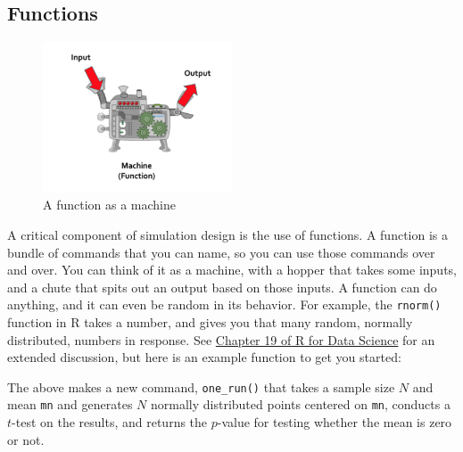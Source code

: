 \documentclass[
]{book}
\newenvironment{Shaded}{\begin{snugshade}}{\end{snugshade}}
\newcommand{\AttributeTok}[1]{\textcolor[rgb]{0.77,0.63,0.00}{#1}}
\newcommand{\ControlFlowTok}[1]{\textcolor[rgb]{0.13,0.29,0.53}{\textbf{#1}}}
\newcommand{\FunctionTok}[1]{\textcolor[rgb]{0.00,0.00,0.00}{#1}}
\newcommand{\NormalTok}[1]{#1}
\newcommand{\OtherTok}[1]{\textcolor[rgb]{0.56,0.35,0.01}{#1}}
\newcommand{\SpecialCharTok}[1]{\textcolor[rgb]{0.00,0.00,0.00}{#1}}
\begin{document}
\hypertarget{functions}{%
\subsection{Functions}\label{functions}}

\begin{figure}
\centering
\includegraphics[width=0.5\textwidth,height=\textheight]{image/function-machine.png}
\caption{A function as a machine}
\end{figure}

A critical component of simulation design is the use of functions.
A function is a bundle of commands that you can name, so you can use those commands over and over.
You can think of it as a machine, with a hopper that takes some inputs, and a chute that spits out an output based on those inputs.
A function can do anything, and it can even be random in its behavior.
For example, the \texttt{rnorm()} function in R takes a number, and gives you that many random, normally distributed, numbers in response.
See \href{https://r4ds.had.co.nz/functions.html}{Chapter 19 of R for Data Science} for an extended discussion, but here is an example function to get you started:

\begin{Shaded}
\end{Shaded}

The above makes a new command, \texttt{one\_run()} that takes a sample size \(N\) and mean \texttt{mn} and generates \(N\) normally distributed points centered on \texttt{mn}, conducts a \(t\)-test on the results, and returns the \(p\)-value for testing whether the mean is zero or not.
\end{document}
